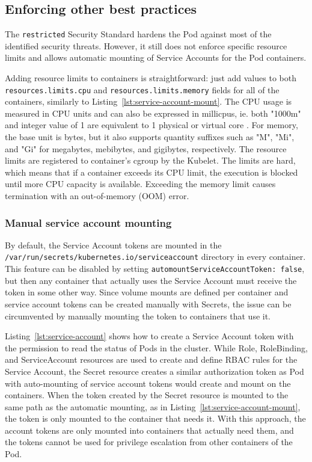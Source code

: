 \documentclass[english, 12pt, a4paper, sci, utf8, a-2b, online]{aaltothesis}
\begin{document}

\subsection{Enforcing other best practices}

The \texttt{restricted} Security Standard hardens the Pod against most of the identified security threats.
However, it still does not enforce specific resource limits and allows automatic mounting of Service Accounts for the Pod containers.

Adding resource limits to containers is straightforward: just add values to both \texttt{resources.limits.cpu} and \texttt{resources.limits.memory} fields for all of the containers, similarly to Listing~\ref{lst:service-account-mount}.
The CPU usage is measured in CPU units and can also be expressed in millicpus, ie. both "1000m" and integer value of 1 are equivalent to 1 physical or virtual core \cite{k8s-docs-resources}.
For memory, the base unit is bytes, but it also supports quantity suffixes such as "M", "Mi", and "Gi" for megabytes, mebibytes, and gigibytes, respectively.
The resource limits are registered to container's cgroup by the Kubelet.
The limits are hard, which means that if a container exceeds its CPU limit, the execution is blocked until more CPU capacity is available.
Exceeding the memory limit causes termination with an out-of-memory (OOM) error.

\subsubsection{Manual service account mounting}

By default, the Service Account tokens are mounted in the \texttt{/var/run/secrets/kubernetes.io/serviceaccount} directory in every container.
This feature can be disabled by setting \texttt{automountServiceAccountToken: false}, but then any container that actually uses the Service Account must receive the token in some other way.
Since volume mounts are defined per container and service account tokens can be created manually with Secrets, the issue can be circumvented by manually mounting the token to containers that use it.



Listing~\ref{lst:service-account} shows how to create a Service Account token with the permission to read the status of Pods in the cluster.
While Role, RoleBinding, and ServiceAccount resources are used to create and define RBAC rules for the Service Account, the Secret resource creates a similar authorization token as Pod with auto-mounting of service account tokens would create and mount on the containers.
When the token created by the Secret resource is mounted to the same path as the automatic mounting, as in Listing~\ref{lst:service-account-mount}, the token is only mounted to the container that needs it.
With this approach, the account tokens are only mounted into containers that actually need them, and the tokens cannot be used for privilege escalation from other containers of the Pod.
\end{document}
